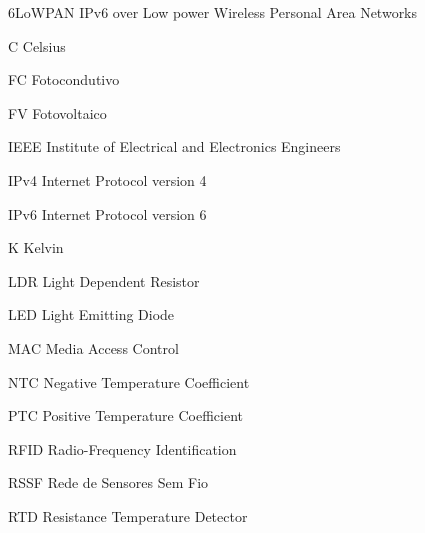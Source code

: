 \begin{siglas}
\item [6LoWPAN] IPv6 over Low power Wireless Personal Area Networks
\item [C]	Celsius
\item [FC]	Fotocondutivo
\item [FV]	Fotovoltaico
\item [IEEE]	Institute of Electrical and Electronics Engineers
\item [IPv4]	Internet Protocol version 4
\item [IPv6]	Internet Protocol version 6
\item [K]	Kelvin
\item [LDR]	Light Dependent Resistor
\item [LED]	Light Emitting Diode
\item [MAC]	Media Access Control
\item [NTC]	Negative Temperature Coefficient
\item [PTC]	Positive Temperature Coefficient
\item [RFID]	Radio-Frequency Identification
\item [RSSF]	Rede de Sensores Sem Fio
\item [RTD]	Resistance Temperature Detector
\end{siglas}
